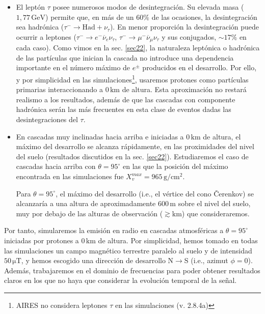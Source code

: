 \documentclass[11 pt, a4paper]{article} %
\numberwithin{equation}{section}
\numberwithin{figure}{section}
\numberwithin{table}{section}
\begin{document}
\begin{itemize}
	\item El leptón $\tau$ posee numerosos modos de desintegración. Su elevada masa ($1,77\,\mathrm{GeV}$) permite que, en más de un $60\%$ de las ocasiones, la desintegración sea hadrónica ($\tau^-\rightarrow\text{Had}+\nu_\tau$). En menor proporción la desintegración puede ocurrir a leptones ($\tau^-\rightarrow e^-\overline{\nu}_e\nu_\tau$, $\tau^-\rightarrow \mu^-\overline{\nu}_\mu\nu_\tau$ y sus conjugados, $\sim17\%$ en cada caso). Como vimos en la sec. \ref{sec22}, la naturaleza leptónica o hadrónica de las partículas que inician la cascada no introduce una dependencia importante en el número máximo de $e^\pm$ producidos en el desarrollo. Por ello, y por simplicidad en las simulaciones\footnote{ AIRES no considera leptones $\tau$ en las simulaciones (v. 2.8.4a)}, usaremos protones como partículas primarias interaccionando a $0\,\mathrm{km}$ de altura. Esta aproximación no restará realismo a los resultados, además de que las cascadas con componente hadrónica serán las más frecuentes en esta clase de eventos dadas las desintegraciones del $\tau$.
	
	\item En cascadas muy inclinadas hacia arriba e iniciadas a $0\,\mathrm{km}$ de altura, el máximo del desarrollo se alcanza rápidamente, en las proximidades del nivel del suelo (resultados discutidos en la sec. \ref{sec22}). Estudiaremos el caso de cascadas hacia arriba con $\theta=95^\circ$ en las que la posición del máximo encontrada en las simulaciones fue $X_{v}^{max}=965\,\mathrm{g/cm^2}$.
	
Para $\theta = 95^\circ$, el máximo del desarrollo (i.e., el vértice del cono \v{C}erenkov) se alcanzaría a una altura de aproximadamente $600\,\mathrm{m}$ sobre el nivel del suelo, muy por debajo de las alturas de observación ($\gtrsim \mathrm{km}$) que consideraremos.
\end{itemize}

Por tanto, simularemos la emisión en radio en cascadas atmosféricas a $\theta=95^\circ$ iniciadas por protones a $0\,\mathrm{km}$ de altura. Por simplicidad, hemos tomado en todas las simulaciones un campo magnético terrestre paralelo al suelo y de intensidad $50\,\mathrm{\mu T}$, y hemos escogido una dirección de desarrollo N$\rightarrow$S (i.e., azimut $\phi=0$). Además, trabajaremos en el dominio de frecuencias para poder obtener resultados claros en los que no haya que considerar la evolución temporal de la señal. 
\end{document}
